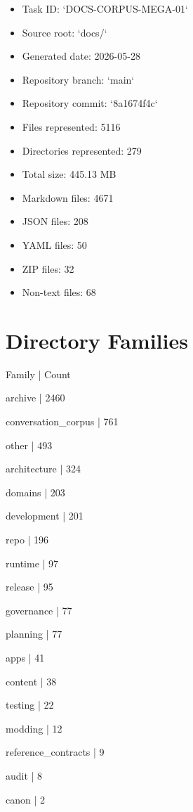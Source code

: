 \documentclass[11pt,a4paper]{report}
\begin{document}
\begin{itemize}
\item Task ID: `DOCS-\allowbreak{}CORPUS-\allowbreak{}MEGA-\allowbreak{}01`
\item Source root: `docs/\allowbreak{}`
\item Generated date: 2026-\allowbreak{}05-\allowbreak{}28
\item Repository branch: `main`
\item Repository commit: `8a1674f4c`
\item Files represented: 5116
\item Directories represented: 279
\item Total size: 445.\allowbreak{}13 MB
\item Markdown files: 4671
\item JSON files: 208
\item YAML files: 50
\item ZIP files: 32
\item Non-\allowbreak{}text files: 68
\end{itemize}

\section{Directory Families}

{\small\ttfamily\raggedright Family | Count\par}
{\small\ttfamily\raggedright archive | 2460\par}
{\small\ttfamily\raggedright conversation\_corpus | 761\par}
{\small\ttfamily\raggedright other | 493\par}
{\small\ttfamily\raggedright architecture | 324\par}
{\small\ttfamily\raggedright domains | 203\par}
{\small\ttfamily\raggedright development | 201\par}
{\small\ttfamily\raggedright repo | 196\par}
{\small\ttfamily\raggedright runtime | 97\par}
{\small\ttfamily\raggedright release | 95\par}
{\small\ttfamily\raggedright governance | 77\par}
{\small\ttfamily\raggedright planning | 77\par}
{\small\ttfamily\raggedright apps | 41\par}
{\small\ttfamily\raggedright content | 38\par}
{\small\ttfamily\raggedright testing | 22\par}
{\small\ttfamily\raggedright modding | 12\par}
{\small\ttfamily\raggedright reference\_contracts | 9\par}
{\small\ttfamily\raggedright audit | 8\par}
{\small\ttfamily\raggedright canon | 2\par}
\end{document}
